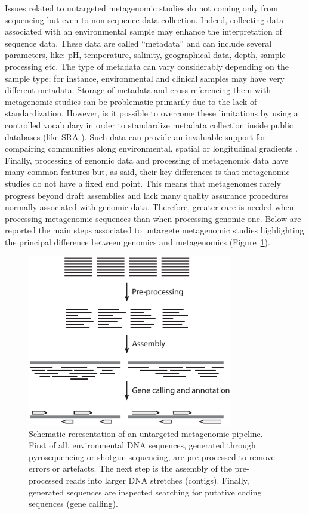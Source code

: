 Issues related to untargeted metagenomic studies do not coming only from sequencing but even to non-sequence data collection. Indeed, collecting data associated with an environmental sample may enhance the interpretation of sequence data. These data are called ``metadata'' and can include several parameters, like: pH, temperature, salinity, geographical data, depth, sample processing etc. The type of metadata can vary considerably depending on the sample type; for instance, environmental and clinical samples may have very different metadata. Storage of metadata and cross-referencing them with metagenomic studies can be problematic primarily due to the lack of standardization. However, is it possible to overcome these limitations by using a controlled vocabulary in order to standardize metadata collection inside public databases (like SRA \cite{kodama2012sequence}). Such data can provide an invaluable support for compairing communities along environmental, spatial or longitudinal gradients \cite{erkel2006genome}.\\
Finally, processing of genomic data and processing of metagenomic data have many common features but, as said, their key differences is that metagenomic studies do not have a fixed end point. This means that metagenomes rarely progress beyond draft assemblies and lack many quality assurance procedures normally associated with genomic data. Therefore, greater care is needed when processing metagenomic sequences than when processing genomic one. Below are reported the main steps associated to untargete metagenomic studies highlighting the principal difference between genomics and metagenomics (Figure~\ref{fig:untrapipe}).\\
\begin{figure}[!tb]
	\centering
	\includegraphics[width=0.8\textwidth]{./figures/Introduction/metagen_pipe_mod}
  	\caption{Schematic reresentation of an untargeted metagenomic pipeline. First of all, environmental DNA sequences, generated through pyrosequencing or shotgun sequencing, are pre-processed to remove errors or artefacts. The next step is the assembly of the pre-processed reads into larger DNA stretches (contigs). Finally, generated sequences are inspected searching for putative coding sequences (gene calling).\label{fig:untrapipe}}
\end{figure}

